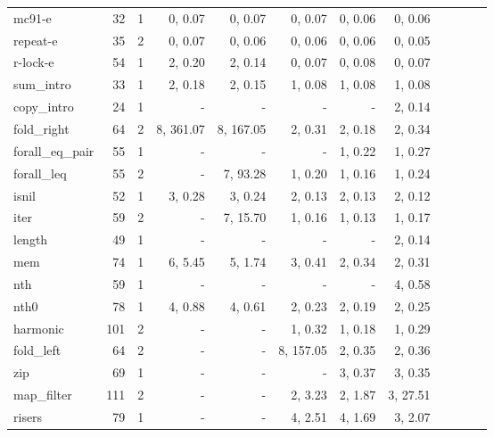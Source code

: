 \begin{table*}
\begin{center}
\begin{tabular}{|l|r|r|r|r|r|r|r|r|r|r|r|}
mc91-e            &    32&  1&  0,    0.07 &  0,    0.07 &  0,    0.07 &  0,    0.06 &  0,    0.06 \\
repeat-e          &    35&  2&  0,    0.07 &  0,    0.06 &  0,    0.06 &  0,    0.06 &  0,    0.05 \\
r-lock-e          &    54&  1&  2,    0.20 &  2,    0.14 &  0,    0.07 &  0,    0.08 &  0,    0.07 \\
\hline
sum\_intro        &   33 & 1 &  2,    0.18 &  2,    0.15 &  1,    0.08 &  1,    0.08 &  1,    0.08 \\
copy\_intro       &   24 & 1 &           - &           - &           - &           - &  2,    0.14 \\
fold\_right       &   64 & 2 &  8,  361.07 &  8,  167.05 &  2,    0.31 &  2,    0.18 &  2,    0.34 \\
forall\_eq\_pair  &   55 & 1 &           - &           - &           - &  1,    0.22 &  1,    0.27 \\
forall\_leq       &   55 & 2 &           - &  7,   93.28 &  1,    0.20 &  1,    0.16 &  1,    0.24 \\
isnil             &   52 & 1 &  3,    0.28 &  3,    0.24 &  2,    0.13 &  2,    0.13 &  2,    0.12 \\
iter              &   59 & 2 &           - &  7,   15.70 &  1,    0.16 &  1,    0.13 &  1,    0.17 \\
length            &   49 & 1 &           - &           - &           - &           - &  2,    0.14 \\
mem               &   74 & 1 &  6,    5.45 &  5,    1.74 &  3,    0.41 &  2,    0.34 &  2,    0.31 \\
nth               &   59 & 1 &           - &           - &           - &           - &  4,    0.58 \\
nth0              &   78 & 1 &  4,    0.88 &  4,    0.61 &  2,    0.23 &  2,    0.19 &  2,    0.25 \\
harmonic          &  101 & 2 &           - &           - &  1,    0.32 &  1,    0.18 &  1,    0.29 \\
fold\_left        &   64 & 2 &           - &           - &  8,  157.05 &  2,    0.35 &  2,    0.36 \\
zip               &   69 & 1 &           - &           - &           - &  3,    0.37 &  3,    0.35 \\
map\_filter       &  111 & 2 &           - &           - &  2,    3.23 &  2,    1.87 &  3,   27.51 \\
risers            &   79 & 1 &           - &           - &  4,    2.51 &  4,    1.69 &  3,    2.07 \\

\end{tabular}
\end{center}
\end{table*}
